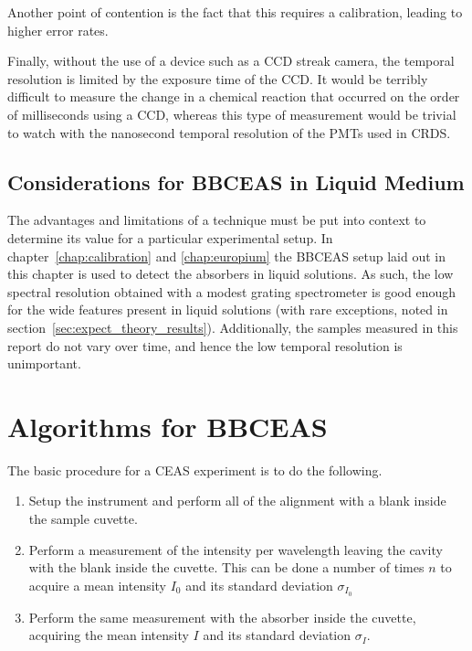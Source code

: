 Another point of contention is the fact that this requires a calibration,
leading to higher error rates.

Finally, without the use of a device such as a \ac{CCD} streak camera, the
temporal resolution is limited by the exposure time of the \ac{CCD}. It would
be terribly difficult to measure the change in a chemical reaction that
occurred on the order of milliseconds using a \ac{CCD}, whereas this type of
measurement would be trivial to watch with the nanosecond temporal resolution
of the \acp{PMT} used in \ac{CRDS}.

\subsection{Considerations for BBCEAS in Liquid Medium}

The advantages and limitations of a technique must be put into context
to determine its value for a particular experimental setup. In
chapter~\ref{chap:calibration} and \ref{chap:europium} the \ac{BBCEAS}
setup laid out in this chapter is used to detect the absorbers in liquid
solutions. As such, the low spectral resolution obtained with a modest grating
spectrometer is good enough for the wide features present in liquid solutions
(with rare exceptions, noted in section~\ref{sec:expect_theory_results}).
Additionally, the samples measured in this report do not vary over time, and
hence the low temporal resolution is unimportant.

\section{Algorithms for BBCEAS}

The basic procedure for a CEAS experiment is to do the following.

\begin{enumerate}
  \item Setup the instrument and perform all of the alignment with a blank
        inside the sample cuvette.
  \item Perform a measurement of the intensity per wavelength leaving the
        cavity with the blank inside the cuvette. This can be done a number of
        times $n$ to acquire a mean intensity $I_0$ and its standard deviation
        $\sigma_{I_0}$
  \item Perform the same measurement with the absorber inside the cuvette,
        acquiring the mean intensity $I$ and its standard deviation
        $\sigma_{I}$.
\end{enumerate}

